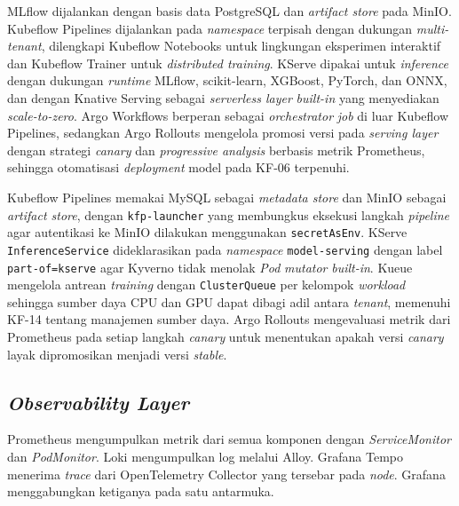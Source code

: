 MLflow \autocite{mlflow2024} dijalankan dengan basis data PostgreSQL dan \textit{artifact store} pada MinIO. Kubeflow Pipelines \autocite{kubeflow2024} dijalankan pada \textit{namespace} terpisah dengan dukungan \textit{multi-tenant}, dilengkapi Kubeflow Notebooks untuk lingkungan eksperimen interaktif dan Kubeflow Trainer \autocite{kubeflowtrainer2025} untuk \textit{distributed training}. KServe \autocite{kserve2024} dipakai untuk \textit{inference} dengan dukungan \textit{runtime} MLflow, scikit-learn, XGBoost, PyTorch, dan ONNX, dan dengan Knative Serving \autocite{knative2025} sebagai \textit{serverless layer} \textit{built-in} yang menyediakan \textit{scale-to-zero}. Argo Workflows berperan sebagai \textit{orchestrator} \textit{job} di luar Kubeflow Pipelines, sedangkan Argo Rollouts \autocite{argorollouts2025} mengelola promosi versi pada \textit{serving layer} dengan strategi \textit{canary} dan \textit{progressive analysis} berbasis metrik Prometheus, sehingga otomatisasi \textit{deployment} model pada KF-06 terpenuhi.

Kubeflow Pipelines memakai MySQL sebagai \textit{metadata store} dan MinIO sebagai \textit{artifact store}, dengan \texttt{kfp-launcher} yang membungkus eksekusi langkah \textit{pipeline} agar autentikasi ke MinIO dilakukan menggunakan \texttt{secretAsEnv}. KServe \texttt{InferenceService} dideklarasikan pada \textit{namespace} \texttt{model-serving} dengan label \texttt{part-of=kserve} agar Kyverno tidak menolak \textit{Pod} \textit{mutator} \textit{built-in}. Kueue \autocite{kueue2024} mengelola antrean \textit{training} dengan \texttt{ClusterQueue} per kelompok \textit{workload} sehingga sumber daya CPU dan GPU dapat dibagi adil antara \textit{tenant}, memenuhi KF-14 tentang manajemen sumber daya. Argo Rollouts mengevaluasi metrik dari Prometheus pada setiap langkah \textit{canary} untuk menentukan apakah versi \textit{canary} layak dipromosikan menjadi versi \textit{stable}.

\subsection{\textit{Observability Layer}}
\label{subsec:impl-observability}

Prometheus \autocite{prometheus2024} mengumpulkan metrik dari semua komponen dengan \textit{ServiceMonitor} dan \textit{PodMonitor}. Loki \autocite{loki2024} mengumpulkan log melalui Alloy. Grafana Tempo \autocite{tempo2024} menerima \textit{trace} dari OpenTelemetry Collector yang tersebar pada \textit{node}. Grafana \autocite{grafana2024} menggabungkan ketiganya pada satu antarmuka.


